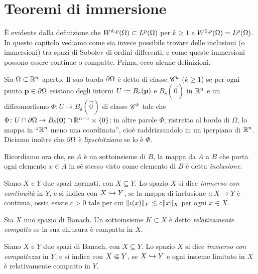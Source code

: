 \section{Teoremi di immersione}
È evidente dalla definizione che $\sobW[k,p]{\Omega}\subset\leb[p]{\Omega}$ per $k\ge 1$ e $\sobW[0,p]{\Omega}=\leb[p]{\Omega}$.
In questo capitolo vediamo come sia invece possibile trovare delle inclusioni (o immersioni) tra spazi di Sobolev di ordini differenti, e come queste immersioni possono essere continue o compatte.
Prima, ecco alcune definizioni.
\begin{definizione} \label{d:bordo-regolare}
    Sia $\Omega\subset\R^n$ aperto.
    Il suo bordo $\boundary\Omega$ è detto di classe $\cclass[k]$ ($k\ge 1$) se per ogni punto $\vec p\in\boundary\Omega$ esistono degli intorni $U\defeq B_r(\vec p)$ e $B_\delta(\vec 0)$ in $\R^n$ e un diffeomorfismo $\Phi\colon U\to B_\delta(\vec 0)$ di classe $\cclass[k]$ tale che $\Phi\colon U\cap\boundary\Omega\to B_\delta(\vec 0)\cap\R^{n-1}\times\{0\}$; in altre parole $\Phi$, ristretto al bordo di $\Omega$, lo mappa in ``$\R^n$ meno una coordinata'', cioè raddrizzandolo in un iperpiano di $\R^n$.
    Diciamo inoltre che $\boundary\Omega$ è \emph{lipschitziano} se lo è $\Phi$.
\end{definizione}
Ricordiamo ora che, se $A$ è un sottoinsieme di $B$, la mappa da $A$ a $B$ che porta ogni elemento $x\in A$ in s\'e stesso visto come elemento di $B$ è detta \emph{inclusione}.
\begin{definizione} \label{d:immersione-continua}
    Siano $X$ e $Y$ due spazi normati, con $X\subseteq Y$.
    Lo spazio $X$ si dice \emph{immerso con continuità} in $Y$, e si indica con $X\emb Y$, se la mappa di inclusione $\iota\colon X\to Y$ è continua, ossia esiste $c>0$ tale per cui $\norm{\iota(x)}_Y\le c\norm{x}_X$ per ogni $x\in X$.
\end{definizione}
\begin{definizione} \label{d:insieme-relativamente-compatto}
    Sia $X$ uno spazio di Banach.
    Un sottoinsieme $K\subset X$ è detto \emph{relativamente compatto} se la sua chiusura è compatta in $X$.
\end{definizione}
\begin{definizione} \label{d:immersione-compatta}
    Siano $X$ e $Y$ due spazi di Banach, con $X\subseteq Y$.
    Lo spazio $X$ si dice \emph{immerso con compattezza} in $Y$, e si indica con $X\cemb Y$, se $X\emb Y$ e ogni insieme limitato in $X$ è relativamente compatto in $Y$.
\end{definizione}

